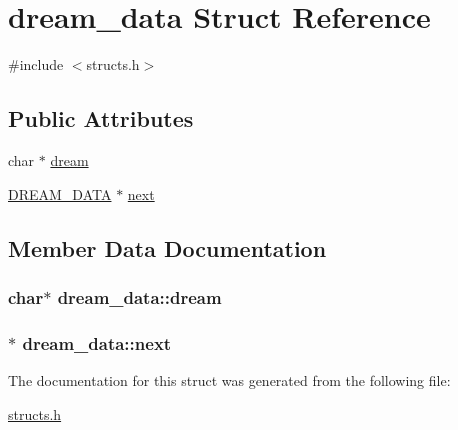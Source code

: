 \hypertarget{structdream__data}{\section{dream\-\_\-data Struct Reference}
\label{structdream__data}
}


{\ttfamily \#include $<$structs.\-h$>$}

\subsection*{Public Attributes}
\begin{DoxyCompactItemize}
\item 
char $\ast$ \hyperlink{structdream__data_aea9276513590fc79128391f74fcd7554}{dream}
\item 
\hyperlink{structs_8h_ad492b5e07b2f546771248e448e429e48}{D\-R\-E\-A\-M\-\_\-\-D\-A\-T\-A} $\ast$ \hyperlink{structdream__data_acecda9e6ae4cfe6ecdf5a04b3575c025}{next}
\end{DoxyCompactItemize}


\subsection{Member Data Documentation}
\hypertarget{structdream__data_aea9276513590fc79128391f74fcd7554}{
\subsubsection[{dream}]{\setlength{\rightskip}{0pt plus 5cm}char$\ast$ dream\-\_\-data\-::dream}}\label{structdream__data_aea9276513590fc79128391f74fcd7554}
\hypertarget{structdream__data_acecda9e6ae4cfe6ecdf5a04b3575c025}{
\subsubsection[{next}]{$\ast$ dream\-\_\-data\-::next}}\label{structdream__data_acecda9e6ae4cfe6ecdf5a04b3575c025}


The documentation for this struct was generated from the following file\-:\begin{DoxyCompactItemize}
\item 
\hyperlink{structs_8h}{structs.\-h}\end{DoxyCompactItemize}
